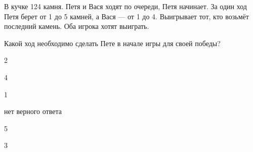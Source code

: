 
\begin{question}
В кучке 124 камня. Петя и Вася ходят по очереди, Петя начинает.
За один ход Петя берет от 1 до 5 камней, а Вася --- от 1 до 4.
Выигрывает тот, кто возьмёт последний камень. Оба игрока хотят выиграть.

Какой ход необходимо сделать Пете в начале игры для своей победы?
\begin{answerlist}
  \item 2
  \item 4
  \item 1
  \item нет верного ответа
  \item 5
  \item 3
\end{answerlist}
\end{question}


